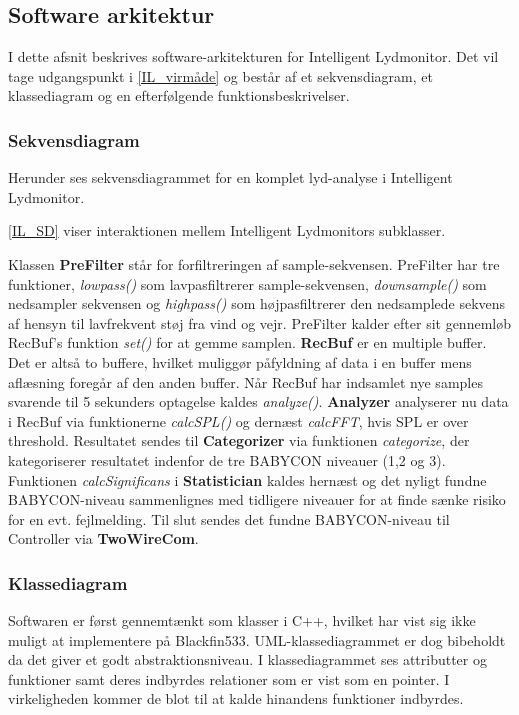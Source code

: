 \newpage
\subsection{Software arkitektur}
I dette afsnit beskrives software-arkitekturen for Intelligent Lydmonitor. Det vil tage udgangspunkt i \ref{IL_virmåde} og består af et sekvensdiagram, et klassediagram og en efterfølgende funktionsbeskrivelser.

\subsubsection*{Sekvensdiagram}
Herunder ses sekvensdiagrammet for en komplet lyd-analyse i Intelligent Lydmonitor.

\ref{IL_SD} viser interaktionen mellem Intelligent Lydmonitors subklasser.

Klassen \textbf{PreFilter} står for forfiltreringen af sample-sekvensen. PreFilter har tre funktioner, \textit{lowpass()} som lavpasfiltrerer sample-sekvensen, \textit{downsample()} som nedsampler sekvensen og \textit{highpass()} som højpasfiltrerer den nedsamplede sekvens af hensyn til lavfrekvent støj fra vind og vejr. PreFilter kalder efter sit gennemløb RecBuf's funktion \textit{set()} for at gemme samplen.
\textbf{RecBuf} er en multiple buffer. Det er altså to buffere, hvilket muliggør påfyldning af data i en buffer mens aflæsning foregår af den anden buffer. Når RecBuf har indsamlet nye samples svarende til 5 sekunders optagelse kaldes \textit{analyze()}. \textbf{Analyzer} analyserer nu data i RecBuf via funktionerne \textit{calcSPL()} og dernæst \textit{calcFFT}, hvis SPL er over threshold. Resultatet sendes til \textbf{Categorizer} via funktionen \textit{categorize}, der kategoriserer resultatet indenfor de tre BABYCON niveauer (1,2 og 3). Funktionen \textit{calcSignificans} i \textbf{Statistician} kaldes hernæst og det nyligt fundne BABYCON-niveau sammenlignes med tidligere niveauer for at finde sænke risiko for en evt. fejlmelding. Til slut sendes det fundne BABYCON-niveau til Controller via \textbf{TwoWireCom}. 

\subsubsection*{Klassediagram}
Softwaren er først gennemtænkt som klasser i C++, hvilket har vist sig ikke muligt at implementere på Blackfin533. UML-klassediagrammet er dog bibeholdt da det giver et godt abstraktionsniveau. I klassediagrammet ses attributter og funktioner samt deres indbyrdes relationer som er vist som en pointer. I virkeligheden kommer de blot til at kalde hinandens funktioner indbyrdes. 

